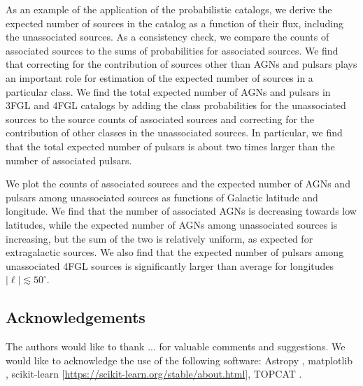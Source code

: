 As an example of the application of the probabilistic catalogs, we derive the expected number of sources in the catalog as a function of their flux, including the unassociated sources.
As a consistency check, we compare the counts of associated sources to the sums of probabilities for associated sources.
We find that correcting for the contribution of sources other than AGNs and pulsars plays an important role for estimation of the expected number of sources in a particular class.
We find the total expected number of AGNs and pulsars in 3FGL and 4FGL catalogs by adding the class probabilities for the unassociated sources to the source counts of associated sources and correcting for the contribution of other classes in the unassociated sources.
In particular, we find that the total expected number of pulsars is about two times larger than the number of associated pulsars.

We plot the counts of associated sources and the expected number of AGNs and pulsars among unassociated sources
as functions of Galactic latitude and longitude.
We find that the number of associated AGNs is decreasing towards low latitudes, while the expected number of AGNs among unassociated sources is increasing, but the sum of the two is relatively uniform, as expected for extragalactic sources.
We also find that the expected number of pulsars among unassociated 4FGL sources is significantly larger than average for longitudes 
$|\ell | \lesssim 50^\circ$.




\subsection*{Acknowledgements}

The authors would like to thank ...
for valuable comments and suggestions.
We would like to acknowledge the use of the following software:
Astropy \citep[\url{http://www.astropy.org},][]{2013A&A...558A..33A}, 
matplotlib \citep{Hunter:2007}, 
scikit-learn [\url{https://scikit-learn.org/stable/about.html}], 
TOPCAT \citep{2005ASPC..347...29T}.
